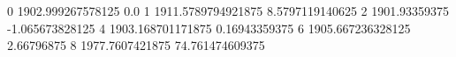 0 1902.999267578125 0.0
1 1911.5789794921875 8.5797119140625
2 1901.93359375 -1.065673828125
4 1903.168701171875 0.16943359375
6 1905.667236328125 2.66796875
8 1977.7607421875 74.761474609375
